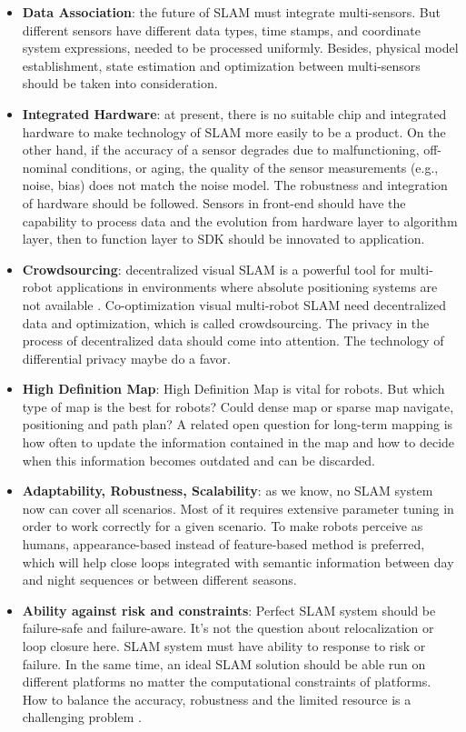 \documentclass[journal,transmag]{IEEEtran}
\begin{document}
\begin{itemize}
    \item \textbf{Data Association}:  the future of SLAM must integrate multi-sensors. But different sensors have different data types, time stamps, and coordinate system expressions, needed to be processed uniformly. Besides, physical model establishment, state estimation and optimization between multi-sensors should be taken into consideration.
    \item \textbf{Integrated Hardware}: at present, there is no suitable chip and integrated hardware to make technology of SLAM more easily to be a product. On the other hand,  if the accuracy of a sensor degrades due to malfunctioning, off-nominal conditions, or aging, the quality of the sensor measurements (e.g., noise, bias) does not match the noise model. The robustness and integration of hardware should be followed. Sensors in front-end should have the capability to process data and the evolution from hardware layer to algorithm layer, then to function layer to SDK should be innovated to application. 
    \item \textbf{Crowdsourcing}: decentralized visual SLAM is a powerful tool for multi-robot applications in environments where absolute positioning systems are not available \cite{cieslewski2018data}. Co-optimization visual multi-robot SLAM need decentralized data and optimization, which is called crowdsourcing. The privacy in the process of decentralized data should come into attention. The technology of differential privacy  \cite{dwork2011differential}\cite{mcsherry2007mechanism}  maybe do a favor. 
    \item \textbf{High Definition Map}: High Definition Map is vital for robots. But which type of map is the best for robots? Could dense map or sparse map navigate, positioning and path plan? A related open question for long-term mapping is how often to update the information contained in the map and how to decide when this information becomes outdated and can be discarded.
    \item \textbf{Adaptability, Robustness, Scalability}:  as we know, no SLAM system now can cover all scenarios. Most of it requires extensive parameter tuning in order to work correctly for a given scenario. To make robots perceive as humans, appearance-based instead of feature-based method is preferred, which will help close loops integrated with semantic information between day and night sequences or between different seasons. 
    \item \textbf{Ability against risk and constraints}: Perfect SLAM system should be failure-safe and failure-aware. It's not the question about relocalization or loop closure here. SLAM system must have ability to response to risk or failure. In the same time, an ideal SLAM solution should be able run on different platforms no matter the computational constraints of platforms. How to balance the accuracy, robustness and the limited resource is a challenging problem \cite{delmerico2018benchmark}. 

\end{itemize}
\end{document}
